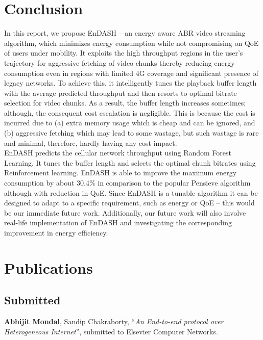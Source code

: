 \section{\textbf{Conclusion}}\label{section:conclusion}
\acresetall
In this report, we propose EnDASH -- an energy aware ABR video streaming algorithm, which minimizes energy consumption while not compromising on QoE of users under mobility. It exploits the high throughput regions in the user's trajectory for aggressive fetching of video chunks thereby reducing energy consumption even in regions with limited 4G coverage and significant presence of legacy networks.  To achieve this, it intelligently tunes the playback buffer length with the average predicted throughput and then resorts to optimal bitrate selection for video chunks. As a result, the buffer length increases sometimes; although, the consequent cost  escalation is negligible. This is because the cost is incurred due to  (a) extra memory usage which is cheap  and can be ignored, and (b) aggressive fetching which may lead to some wastage, but such wastage is rare and minimal, therefore, hardly having any cost impact.\\  %
\indent EnDASH predicts the cellular network throughput using Random Forest Learning. It tunes the buffer length and selects the optimal chunk bitrates using Reinforcement learning. EnDASH is able to improve the maximum energy consumption by about 30.4\% in comparison to the popular Pensieve algorithm although with reduction in QoE. Since EnDASH is a tunable algorithm it can be designed to adapt to a specific  requirement, such as energy or QoE -- this would be our immediate future work.  Additionally, our future work will also involve real-life implementation of EnDASH and investigating the corresponding improvement in energy efficiency.

\section*{Publications}

\subsection*{Submitted}
\begin{enumerate}[start=1,label={[\arabic*]}]
	\item \textbf{Abhijit Mondal}, Sandip Chakraborty, ``\textit{An End-to-end protocol over Heterogeneous Internet}'', submitted to Elsevier Computer Networks.
\end{enumerate}

